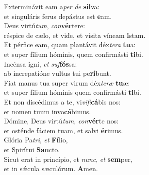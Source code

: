 \evenverse Exterminávit eam a\textit{per} \textit{de} \textbf{sil}va:~\*\\
\evenverse et singuláris ferus depástus est \textbf{e}am.\\
\oddverse Deus virtú\textit{tum}, \textit{con}\textbf{vér}tere:~\*\\
\oddverse réspice de cælo, et vide, et vísita víneam \textbf{i}stam.\\
\evenverse Et pérfice eam, quam plantávit déx\textit{te}\textit{ra} \textbf{tu}a:~\*\\
\evenverse et super fílium hóminis, quem confirmásti \textbf{ti}bi.\\
\oddverse Incénsa igni, \textit{et} \textit{suf}\textbf{fós}sa:~\*\\
\oddverse ab increpatióne vultus tui pe\textbf{rí}bunt.\\
\evenverse Fiat manus tua super virum déx\textit{te}\textit{ræ} \textbf{tu}æ:~\*\\
\evenverse et super fílium hóminis quem confirmásti \textbf{ti}bi.\\
\oddverse Et non discédimus a te, vi\textit{vi}\textit{fi}\textbf{cá}bis nos:~\*\\
\oddverse et nomen tuum invo\textbf{cá}bimus.\\
\evenverse Dómine, Deus virtú\textit{tum}, \textit{con}\textbf{vér}te nos:~\*\\
\evenverse et osténde fáciem tuam, et salvi \textbf{é}rimus.\\
\oddverse Glória Pa\textit{tri}, \textit{et} \textbf{Fí}lio,~\*\\
\oddverse et Spirítui \textbf{San}cto.\\
\evenverse Sicut erat in princípio, et \textit{nunc}, \textit{et} \textbf{sem}per,~\*\\
\evenverse et in sǽcula sæculórum. \textbf{A}men.\\
